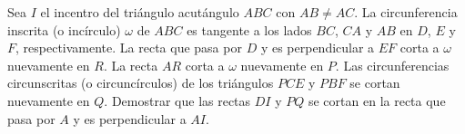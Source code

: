 Sea $I$ el incentro del triángulo acutángulo $ABC$ con $AB\neq AC$. La circunferencia inscrita (o incírculo) $\omega$ de $ABC$ es tangente a los lados $BC$, $CA$ y $AB$ en $D$, $E$ y $F$, respectivamente. La recta que pasa por $D$ y es perpendicular a $EF$ corta a $\omega$ nuevamente en $R$. La recta $AR$ corta a $\omega$ nuevamente en $P$. Las circunferencias circunscritas (o circuncírculos) de los triángulos $PCE$ y $PBF$ se cortan nuevamente en $Q$.
Demostrar que las rectas $DI$ y $PQ$ se cortan en la recta que pasa por $A$ y es perpendicular a $AI.$